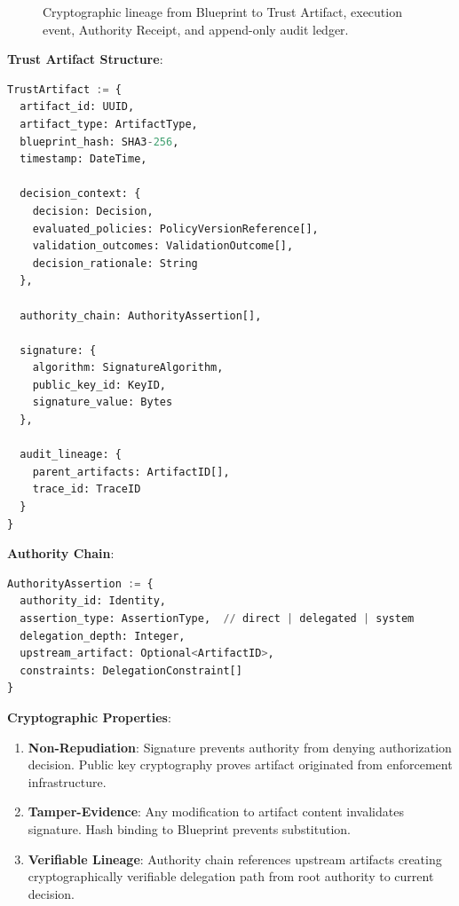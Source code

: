 \documentclass[11pt,letterpaper]{article}
\begin{document}
\begin{figure}[t]
  \caption{Cryptographic lineage from Blueprint to Trust Artifact, execution event, Authority Receipt, and append-only audit ledger.}
  \label{fig:artifact-lineage}
\end{figure}

\textbf{Trust Artifact Structure}:

\begin{lstlisting}[language=Python,caption=Trust Artifact Structure]
TrustArtifact := {
  artifact_id: UUID,
  artifact_type: ArtifactType,
  blueprint_hash: SHA3-256,
  timestamp: DateTime,
  
  decision_context: {
    decision: Decision,
    evaluated_policies: PolicyVersionReference[],
    validation_outcomes: ValidationOutcome[],
    decision_rationale: String
  },
  
  authority_chain: AuthorityAssertion[],
  
  signature: {
    algorithm: SignatureAlgorithm,
    public_key_id: KeyID,
    signature_value: Bytes
  },
  
  audit_lineage: {
    parent_artifacts: ArtifactID[],
    trace_id: TraceID
  }
}
\end{lstlisting}

\textbf{Authority Chain}:

\begin{lstlisting}[language=Python,caption=Authority Chain Structure]
AuthorityAssertion := {
  authority_id: Identity,
  assertion_type: AssertionType,  // direct | delegated | system
  delegation_depth: Integer,
  upstream_artifact: Optional<ArtifactID>,
  constraints: DelegationConstraint[]
}
\end{lstlisting}

\textbf{Cryptographic Properties}:

\begin{enumerate}
\item \textbf{Non-Repudiation}: Signature prevents authority from denying authorization decision. Public key cryptography proves artifact originated from enforcement infrastructure.

\item \textbf{Tamper-Evidence}: Any modification to artifact content invalidates signature. Hash binding to Blueprint prevents substitution.

\item \textbf{Verifiable Lineage}: Authority chain references upstream artifacts creating cryptographically verifiable delegation path from root authority to current decision.
\end{enumerate}
\end{document}
